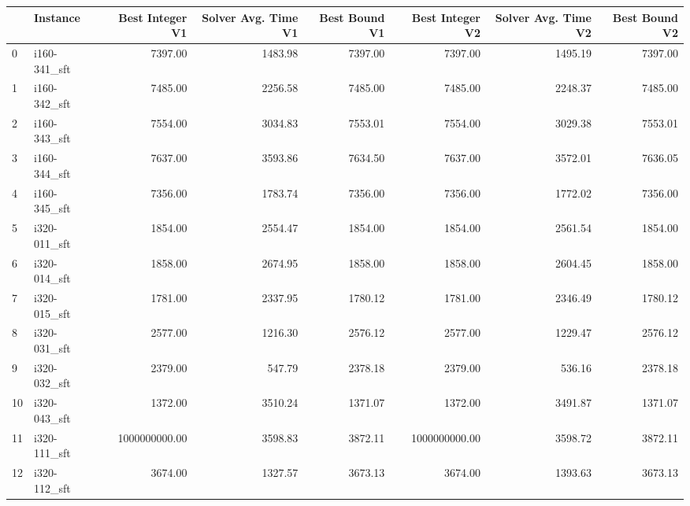 \begin{tabular}{llrrrrrr}
\toprule
{} &      Instance &  Best Integer V1 &  Solver Avg. Time V1 &  Best Bound V1 &  Best Integer V2 &  Solver Avg. Time V2 &  Best Bound V2 \\
\midrule
0  &  i160-341\_sft &          7397.00 &              1483.98 &        7397.00 &          7397.00 &              1495.19 &        7397.00 \\
1  &  i160-342\_sft &          7485.00 &              2256.58 &        7485.00 &          7485.00 &              2248.37 &        7485.00 \\
2  &  i160-343\_sft &          7554.00 &              3034.83 &        7553.01 &          7554.00 &              3029.38 &        7553.01 \\
3  &  i160-344\_sft &          7637.00 &              3593.86 &        7634.50 &          7637.00 &              3572.01 &        7636.05 \\
4  &  i160-345\_sft &          7356.00 &              1783.74 &        7356.00 &          7356.00 &              1772.02 &        7356.00 \\
5  &  i320-011\_sft &          1854.00 &              2554.47 &        1854.00 &          1854.00 &              2561.54 &        1854.00 \\
6  &  i320-014\_sft &          1858.00 &              2674.95 &        1858.00 &          1858.00 &              2604.45 &        1858.00 \\
7  &  i320-015\_sft &          1781.00 &              2337.95 &        1780.12 &          1781.00 &              2346.49 &        1780.12 \\
8  &  i320-031\_sft &          2577.00 &              1216.30 &        2576.12 &          2577.00 &              1229.47 &        2576.12 \\
9  &  i320-032\_sft &          2379.00 &               547.79 &        2378.18 &          2379.00 &               536.16 &        2378.18 \\
10 &  i320-043\_sft &          1372.00 &              3510.24 &        1371.07 &          1372.00 &              3491.87 &        1371.07 \\
11 &  i320-111\_sft &    1000000000.00 &              3598.83 &        3872.11 &    1000000000.00 &              3598.72 &        3872.11 \\
12 &  i320-112\_sft &          3674.00 &              1327.57 &        3673.13 &          3674.00 &              1393.63 &        3673.13 \\

\end{tabular}
